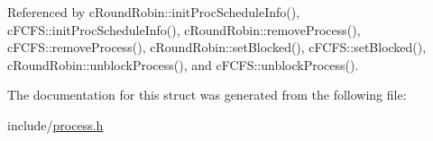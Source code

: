 \-Referenced by c\-Round\-Robin\-::init\-Proc\-Schedule\-Info(), c\-F\-C\-F\-S\-::init\-Proc\-Schedule\-Info(), c\-Round\-Robin\-::remove\-Process(), c\-F\-C\-F\-S\-::remove\-Process(), c\-Round\-Robin\-::set\-Blocked(), c\-F\-C\-F\-S\-::set\-Blocked(), c\-Round\-Robin\-::unblock\-Process(), and c\-F\-C\-F\-S\-::unblock\-Process().



\-The documentation for this struct was generated from the following file\-:\begin{DoxyCompactItemize}
\item 
include/\hyperlink{process_8h}{process.\-h}\end{DoxyCompactItemize}
